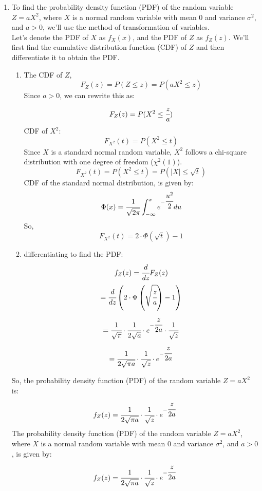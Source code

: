 \documentclass{article}
\begin{document}
\begin{enumerate}
\item 
    To find the probability density function (PDF) of the random variable $Z = aX^2$, where $X$ is a normal random variable with mean 0 and variance $\sigma^2$, and $a > 0$, we'll use the method of transformation of variables.\\
    Let's denote the PDF of $X$ as $f_X(x)$, and the PDF of $Z$ as $f_Z(z)$. We'll first find the cumulative distribution function (CDF) of $Z$ and then differentiate it to obtain the PDF.
    \begin{enumerate}
        \item 
        The CDF of $Z$,
        \[
            F_Z(z) = P(Z \leq z) = P(aX^2 \leq z)
        \]
        Since $a > 0$, we can rewrite this as:
        \[
            F_Z(z) = P(X^2 \leq \cfrac{z}{a})
        \]
        CDF of $X^2$:
        \[
            F_{X^2}(t) = P(X^2 \leq t)
        \]
        Since $X$ is a standard normal random variable, $X^2$ follows a chi-square distribution with one degree of freedom ($\chi^2(1)$).
        \[
            F_{X^2}(t) = P(X^2 \leq t) = P(|X| \leq \sqrt{t})
        \]
        CDF of the standard normal distribution, is given by:
        \[
            \Phi(x) = \cfrac{1}{\sqrt{2\pi}} \int_{-\infty}^x e^{-\cfrac{u^2}{2}} du
        \]
        So,
        \[
            F_{X^2}(t) = 2 \cdot \Phi(\sqrt{t}) - 1
        \]
    \end{enumerate}
    \begin{enumerate}
        \setcounter{enumi}{1}
        \item differentiating to find the PDF:
        \[
            f_Z(z) = \cfrac{d}{dz}F_Z(z)
        \]
        \[
            = \cfrac{d}{dz}\left(2 \cdot \Phi\left(\sqrt{\cfrac{z}{a}}\right) - 1\right)
        \]
        \[
            = \cfrac{1}{\sqrt{\pi}} \cdot \cfrac{1}{2\sqrt{a}} \cdot e^{-\cfrac{z}{2a}} \cdot \cfrac{1}{\sqrt{z}}
        \]
        \[
            = \cfrac{1}{2\sqrt{\pi a}} \cdot \cfrac{1}{\sqrt{z}} \cdot e^{-\cfrac{z}{2a}}
        \]
    \end{enumerate}
    So, the probability density function (PDF) of the random variable $Z = aX^2$ is:
    \[
        f_Z(z) = \cfrac{1}{2\sqrt{\pi a}} \cdot \cfrac{1}{\sqrt{z}} \cdot e^{-\cfrac{z}{2a}}
    \]
    The probability density function (PDF) of the random variable $Z = aX^2$, where $X$ is a normal random variable with mean 0 and variance $\sigma^2$, and $a > 0$, is given by:
    \[
        f_Z(z) = \cfrac{1}{2\sqrt{\pi a}} \cdot \cfrac{1}{\sqrt{z}} \cdot e^{-\cfrac{z}{2a}}
    \]


\end{enumerate}
\end{document}
